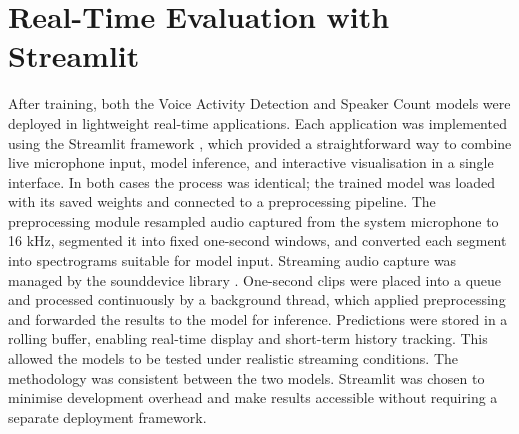 \section{Real-Time Evaluation with Streamlit}
After training, both the Voice Activity Detection and Speaker Count models were deployed in lightweight real-time applications. Each application was implemented using the Streamlit framework \cite{streamlit}, which provided a straightforward way to combine live microphone input, model inference, and interactive visualisation in a single interface. In both cases the process was identical; the trained model was loaded with its saved weights and connected to a preprocessing pipeline. The preprocessing module resampled audio captured from the system microphone to 16 kHz, segmented it into fixed one-second windows, and converted each segment into spectrograms suitable for model input. \newline\newline Streaming audio capture was managed by the sounddevice library \cite{sounddevice}. One-second clips were placed into a queue and processed continuously by a background thread, which applied preprocessing and forwarded the results to the model for inference. Predictions were stored in a rolling buffer, enabling real-time display and short-term history tracking. This allowed the models to be tested under realistic streaming conditions. The methodology was consistent between the two models. Streamlit was chosen to minimise development overhead and make results accessible without requiring a separate deployment framework.